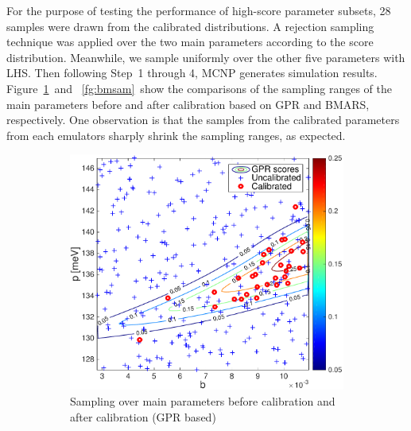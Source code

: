 \documentclass[review]{elsarticle}
\begin{document}
For the  purpose of testing the performance of high-score parameter subsets, {28  samples were drawn from} the calibrated distributions. A rejection sampling technique was applied over the two main parameters according to the score distribution. Meanwhile, we sample uniformly over the other five parameters with LHS. Then following Step~1 through 4, MCNP generates simulation results. Figure~\ref{fg:gpsam}~and ~\ref{fg:bmsam}~show the comparisons of the sampling ranges of the main parameters before and after calibration based on GPR and BMARS, respectively. One observation is that the samples from the calibrated parameters from each emulators sharply shrink the sampling ranges, as expected. 

\begin{figure}[ht!]
\begin{subfigure}{0.5\textwidth}
\centering
\hspace*{-2.2cm}\includegraphics[width=1.4\linewidth]{NSE15-48R1_Figure14a.pdf}
\caption{Sampling over main parameters before calibration and after calibration (GPR based)}
\label{fg:gpsam}
\end{subfigure}
~
\begin{subfigure}{0.5\textwidth}
\centering

\end{subfigure}
\end{figure}
\end{document}
